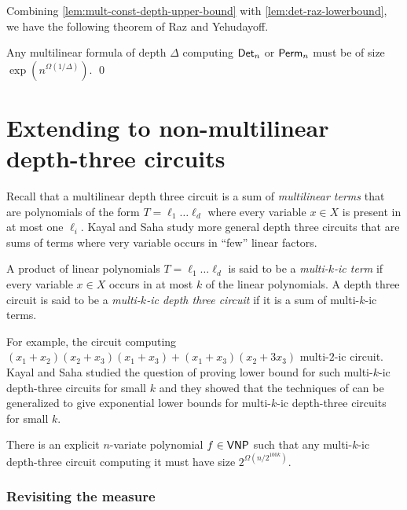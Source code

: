 Combining \autoref{lem:mult-const-depth-upper-bound} with \autoref{lem:det-raz-lowerbound}, we have the following theorem of Raz and Yehudayoff. 

\begin{theorem}
Any multilinear formula of depth $\Delta$ computing $\operatorname{\mathsf{Det}}_n$ or $\operatorname{\mathsf{Perm}}_n$ must be of size $\exp(n^{\Omega(1/\Delta)})$.  \qed
\end{theorem}

\section{Extending to non-multilinear depth-three circuits}

Recall that a multilinear depth three circuit is a sum of \emph{multilinear terms} that are polynomials of the form $T = \ell_1 \dots \ell_d$ where every variable $x \in X$ is present in at most one $\ell_i$. 
Kayal and Saha \cite{ks15} study more general depth three circuits that are sums of terms where very variable occurs in ``few'' linear factors. 

\begin{definition}
  A product of linear polynomials $T = \ell_1 \dots \ell_d$ is said to be a \emph{multi-$k$-ic term} if every variable $x \in X$ occurs in at most $k$ of the linear polynomials. 
A depth three circuit is said to be a \emph{multi-$k$-ic depth three circuit} if it is a sum of multi-$k$-ic terms. 
\end{definition} 

For example, the circuit computing $(x_1 + x_2)(x_2 + x_3)(x_1 +x_3) + (x_1 + x_3)(x_2 + 3x_3)$ multi-$2$-ic circuit. \\

Kayal and Saha \cite{ks15} studied the question of proving lower bound for such multi-$k$-ic depth-three circuits for small $k$ and they showed that the techniques of \cite{raz2004} can be generalized to give exponential lower bounds for multi-$k$-ic depth-three circuits for small $k$. 

\begin{theorem}[\cite{ks15}]\label{thm:multi-k-ic} There is an explicit $n$-variate polynomial $f \in \mathsf{VNP}$ such that any multi-$k$-ic depth-three circuit computing it must have size $2^{\Omega(n/2^{100k})}$. 
\end{theorem}

\subsubsection*{Revisiting the measure}

